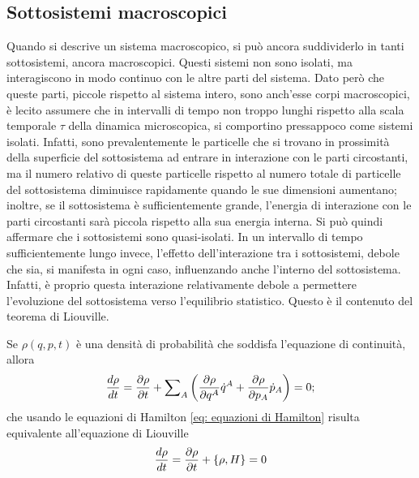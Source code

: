 \subsection{Sottosistemi macroscopici}
Quando si descrive un sistema macroscopico, si può ancora suddividerlo in tanti sottosistemi, ancora macroscopici. Questi sistemi non sono isolati, ma interagiscono in modo continuo con le altre parti del sistema. Dato però che queste parti, piccole rispetto al sistema intero, sono anch'esse corpi macroscopici, è lecito assumere che in intervalli di tempo non troppo lunghi rispetto alla scala temporale $\tau$ della dinamica microscopica, si comportino pressappoco come sistemi isolati. Infatti, sono prevalentemente le particelle che si trovano in prossimità della superficie del sottosistema ad entrare in interazione con le parti circostanti, ma il numero relativo di queste particelle rispetto al numero totale di particelle del sottosistema diminuisce rapidamente quando le sue dimensioni aumentano; inoltre, se il sottosistema è sufficientemente grande, l'energia di interazione con le parti circostanti sarà piccola rispetto alla sua energia interna. Si può quindi affermare che i sottosistemi sono quasi-isolati. In un intervallo di tempo sufficientemente lungo invece, l'effetto dell'interazione tra i sottosistemi, debole che sia, si manifesta in ogni caso, influenzando anche l'interno del sottosistema. Infatti, è proprio questa interazione relativamente debole a permettere l'evoluzione del sottosistema verso l'equilibrio statistico. Questo è il contenuto del teorema di Liouville.
\begin{teo}[di Liouville]
\label{teo: teorema di Liouville}
    Se $\rho(q,p,t)$ è una densità di probabilità che soddisfa l'equazione di continuità, allora 
    \begin{equation}
        \frac{d\rho}{dt} = \frac{\partial \rho}{\partial t} + \sum\nolimits_A\bigg(\frac{\partial\rho}{\partial q^A}\dot{q}^A + \frac{\partial\rho}{\partial p_A}\dot{p}_A\bigg) = 0;
    \end{equation}
    che usando le equazioni di Hamilton \eqref{eq: equazioni di Hamilton} risulta equivalente all'equazione di Liouville
    \begin{equation}
    \label{eq: equazione di Liouville}
         \frac{d\rho}{dt} = \frac{\partial\rho}{\partial t} + \{\rho,H\} = 0
    \end{equation}
\end{teo}
